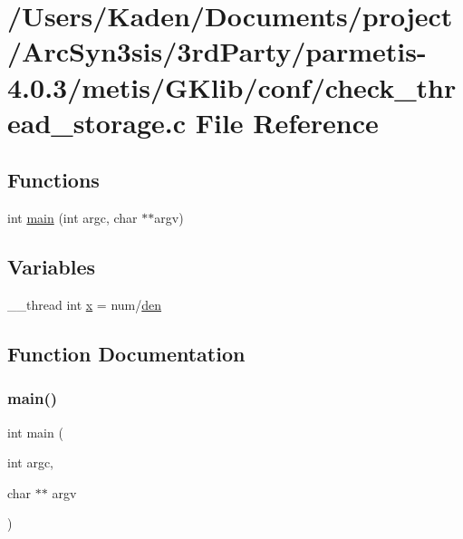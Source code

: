 \hypertarget{a00020}{}\section{/\+Users/\+Kaden/\+Documents/project/\+Arc\+Syn3sis/3rd\+Party/parmetis-\/4.0.3/metis/\+G\+Klib/conf/check\+\_\+thread\+\_\+storage.c File Reference}
\label{a00020}
\subsection*{Functions}
\begin{DoxyCompactItemize}
\item 
int \hyperlink{a00020_a3c04138a5bfe5d72780bb7e82a18e627}{main} (int argc, char $\ast$$\ast$argv)
\end{DoxyCompactItemize}
\subsection*{Variables}
\begin{DoxyCompactItemize}
\item 
\+\_\+\+\_\+thread int \hyperlink{a00020_ac98c3bb25378222646e977292011625f}{x} = num/\hyperlink{a00605_a075a79fb221852f46c51b49f9d83204b}{den}
\end{DoxyCompactItemize}


\subsection{Function Documentation}
\mbox{\label{a00020_a3c04138a5bfe5d72780bb7e82a18e627}} 
\subsubsection{\texorpdfstring{main()}{main()}}
{\footnotesize\ttfamily int main (\begin{DoxyParamCaption}\item[{int}]{argc,  }\item[{char $\ast$$\ast$}]{argv }\end{DoxyParamCaption})}



